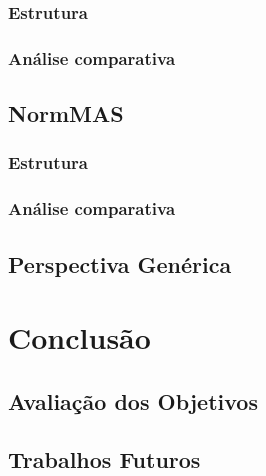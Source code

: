 \documentclass[openright]{normas-utf-tex} %
\begin{document}
		\subsection{Estrutura}

			

		\subsection{Análise comparativa}

			


	\section{NormMAS}

		

		\subsection{Estrutura}
		
			

		\subsection{Análise comparativa}

			

	\section{Perspectiva Genérica}

	

\label{chap:anacomp}

\chapter{Conclusão}
\label{chpa:conc}
	
	\section{Avaliação dos Objetivos}

		

	\section{Trabalhos Futuros}
\end{document}
